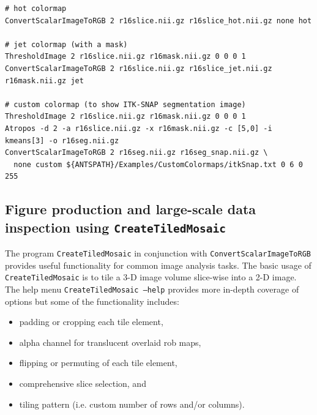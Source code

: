 \documentclass{InsightArticle}
\begin{document}
\begin{lstlisting}
# hot colormap
ConvertScalarImageToRGB 2 r16slice.nii.gz r16slice_hot.nii.gz none hot

# jet colormap (with a mask)
ThresholdImage 2 r16slice.nii.gz r16mask.nii.gz 0 0 0 1
ConvertScalarImageToRGB 2 r16slice.nii.gz r16slice_jet.nii.gz r16mask.nii.gz jet

# custom colormap (to show ITK-SNAP segmentation image)
ThresholdImage 2 r16slice.nii.gz r16mask.nii.gz 0 0 0 1
Atropos -d 2 -a r16slice.nii.gz -x r16mask.nii.gz -c [5,0] -i kmeans[3] -o r16seg.nii.gz
ConvertScalarImageToRGB 2 r16seg.nii.gz r16seg_snap.nii.gz \
  none custom ${ANTSPATH}/Examples/CustomColormaps/itkSnap.txt 0 6 0 255
\end{lstlisting}


\subsection{Figure production and large-scale data inspection using {\tt CreateTiledMosaic}}
The program {\tt CreateTiledMosaic} in conjunction with {\tt ConvertScalarImageToRGB} provides
useful functionality for common image analysis tasks.  The basic usage of {\tt CreateTiledMosaic}
is to tile a 3-D image volume slice-wise into a 2-D image.  The help menu {\tt CreateTiledMosaic --help}
provides more in-depth coverage of options but some of the functionality includes:
\begin{itemize}
  \item padding or cropping each tile element,
  \item alpha channel for translucent overlaid rob maps,
  \item flipping or permuting of each tile element, 
  \item comprehensive slice selection, and
  \item tiling pattern (i.e. custom number of rows and/or columns).
\end{itemize}
\end{document}
